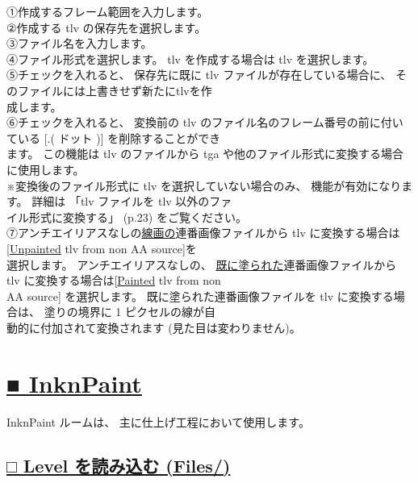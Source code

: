 \documentclass[a4paper,10pt]{article}
\begin{document}
\small
\noindent ①作成するフレーム範囲を入力します。\\
②作成する tlv の保存先を選択します。\\
③ファイル名を入力します。\\
④ファイル形式を選択します。 tlv を作成する場合は tlv を選択します。\\
⑤チェックを入れると、 保存先に既に tlv ファイルが存在している場合に、 そのファイルには上書きせず新たにtlvを作\\
成します。\\
⑥チェックを入れると、 変換前の tlv のファイル名のフレーム番号の前に付いている [.( ドット )] を削除することができ\\
ます。 この機能は tlv のファイルから tga や他のファイル形式に変換する場合に使用します。\\
※変換後のファイル形式に tlv を選択していない場合のみ、 機能が有効になります。 詳細は 「tlv ファイルを tlv 以外のファ\\
イル形式に変換する」 (p.23) をご覧ください。\\
⑦アンチエイリアスなしの\uline{線画の}連番画像ファイルから tlv に変換する場合は [\uline{Unpainted} tlv from non AA source]を\\
選択します。 アンチエイリアスなしの、 \uline{既に塗られた}連番画像ファイルから tlv に変換する場合は[\uline{Painted} tlv from non\\
AA source] を選択します。 既に塗られた連番画像ファイルを tlv に変換する場合は、 塗りの境界に 1 ピクセルの線が自\\
動的に付加されて変換されます (見た目は変わりません)。

\newpage

\section*{\uline{■ InknPaint}}

\noindent InknPaint ルームは、 主に仕上げ工程において使用します。\\[-0.3em]

\subsection*{\uline{□ Level を読み込む (Files/)}}
\end{document}
